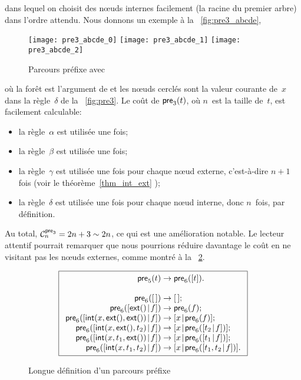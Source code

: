 dans lequel on choisit des n{\oe}uds internes facilement (la racine du
premier arbre) dans l'ordre attendu. Nous donnons un exemple à la \fig~\vref{fig:pre3_abcde},
\begin{figure}
\centering
\texttt{[image: pre3\_abcde\_0]}
\texttt{[image: pre3\_abcde\_1]}
\texttt{[image: pre3\_abcde\_2]}
\caption{Parcours préfixe avec 
\label{fig:pre3_abcde}}
\end{figure}
où la forêt est l'argument de  et les n{\oe}uds
cerclés sont la valeur courante de~\(x\) dans la règle~\(\delta\) de
la \fig~\ref{fig:pre3}. Le coût de
\(\fun{pre}_3(t)\), où \(n\)~est la taille
de~\(t\), est facilement calculable:
\begin{itemize}

  \item la règle~\(\alpha\) est utilisée une fois;

  \item la règle~\(\beta\) est utilisée une fois;

  \item la règle~\(\gamma\) est utilisée une fois pour chaque n{\oe}ud
    externe, c'est-à-dire \(n+1\) fois (voir le
    théorème~\ref{thm_int_ext} );

  \item la règle~\(\delta\) est utilisée une fois pour chaque n{\oe}ud
    interne, donc \(n\)~fois, par définition.

\end{itemize}
Au total, \(\C{\fun{pre}_3}{n} = 2n + 3 \sim
2n\), ce qui est une amélioration
notable. Le lecteur attentif pourrait remarquer que nous pourrions
réduire davantage le coût en ne visitant pas les n{\oe}uds externes,
comme montré à la \fig~\ref{fig:pre5}.
\begin{figure}[b]
\begin{equation*}
\boxed{
\begin{array}{r@{\;}c@{\;}l}
\fun{pre}_5(t) & \rightarrow & \fun{pre}_6([t]).\\
\\
\fun{pre}_6(\el) & \rightarrow & \el;\\
\fun{pre}_6(\cons{\fun{ext}()}{f})
  & \rightarrow & \fun{pre}_6(f);\\
\fun{pre}_6(\cons{\fun{int}(x,\fun{ext}(),\fun{ext}())}{f})
  & \rightarrow & \cons{x}{\fun{pre}_6(f)};\\
\fun{pre}_6(\cons{\fun{int}(x,\fun{ext}(),t_2)}{f})
  & \rightarrow & \cons{x}{\fun{pre}_6(\cons{t_2}{f})};\\
\fun{pre}_6(\cons{\fun{int}(x, t_1, \fun{ext}())}{f})
  & \rightarrow & \cons{x}{\fun{pre}_6(\cons{t_1}{f})};\\
\fun{pre}_6(\cons{\fun{int}(x,t_1,t_2)}{f})
  & \rightarrow & \cons{x}{\fun{pre}_6(\cons{t_1,t_2}{f})}.
\end{array}}
\end{equation*}
\caption{Longue définition d'un parcours préfixe\label{fig:pre5}}
\end{figure}
